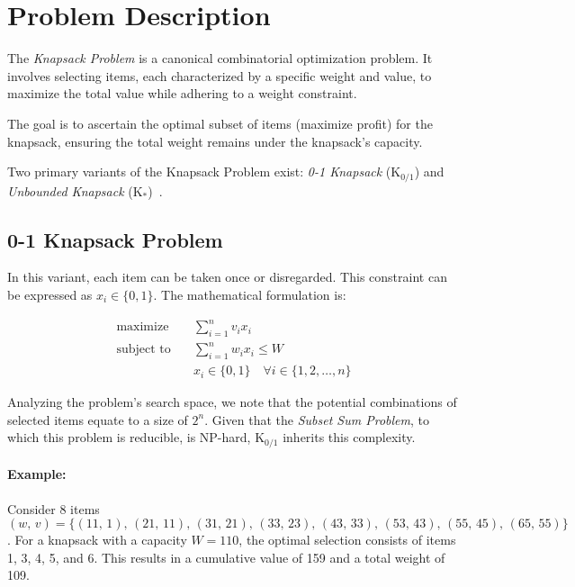 \section{Problem Description}
\label{sec:knapsack:probl}
  The \emph{Knapsack Problem} is a canonical combinatorial optimization problem. 
  It involves selecting items, each characterized by a specific weight and 
  value, to maximize the total value while adhering to a weight constraint. 

  The goal is to ascertain the optimal subset of items (maximize profit) for the 
  knapsack, ensuring the total weight remains under the knapsack's capacity.

  Two primary variants of the Knapsack Problem exist: \emph{0-1 Knapsack}
  (\(\mathrm{K_{0 / 1}}\))\autocite{sahniApproximateAlgorithmsKnapsack1975,bergelAgileArtificialIntelligence2020,wangFastPolynomialTime2022}
  and \emph{Unbounded Knapsack} (\(\mathrm{K_{*}}\))~\autocite{andonovUnboundedKnapsackProblem2000,bergelAgileArtificialIntelligence2020}.

  \subsection{0-1 Knapsack Problem}
    In this variant, each item can be taken once or disregarded.
    This constraint can be expressed as \(x_i \in \{0, 1\}\).
    The mathematical formulation is:

    \begin{equation}
      \label{eq:knapsack:01}
      \begin{aligned}
        \text{maximize} \quad & \sum_{i=1}^{n} v_i x_i \\
        \text{subject to} \quad & \sum_{i=1}^{n} w_i x_i \leq W \\
          & x_i \in \{0, 1\} \quad \forall i \in \{1, 2, \dots, n\}
      \end{aligned}
    \end{equation}

    Analyzing the problem's search space, we note that the potential 
    combinations of selected items equate to a size of \(2^n\).
    Given that the \emph{Subset Sum Problem}, to which this problem is 
    reducible, is NP-hard, \(\mathrm{K}_{0/1}\) inherits this complexity.

    \paragraph{Example:}
      Consider 8 items \((w,\, v) = \{(11,\, 1),\, (21,\, 11),\, (31,\, 21),\, 
      (33,\, 23),\, (43,\, 33),\, (53,\, 43),\, (55,\, 45),\, (65,\, 55)\}\). 
      For a knapsack with a capacity \(W = 110\), the optimal selection consists
      of items 1, 3, 4, 5, and 6.
      This results in a cumulative value of 159 and a total weight of 109.
  

